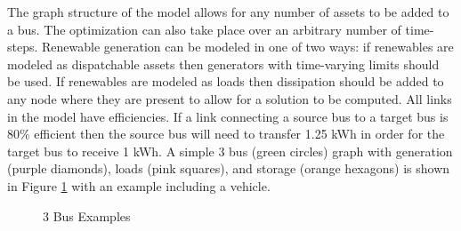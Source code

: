 \documentclass[12pt]{article}
\begin{document}
The graph structure of the model allows for any number of assets to be added to a bus. The optimization can also take place over an arbitrary number of time-steps. Renewable generation can be modeled in one of two ways: if renewables are modeled as dispatchable assets then generators with time-varying limits should be used. If renewables are modeled as loads then dissipation should be added to any node where they are present to allow for a solution to be computed. All links in the model have efficiencies. If a link connecting a source bus to a target bus is 80\% efficient then the source bus will need to transfer 1.25 kWh in order for the target bus to receive 1 kWh. A simple 3 bus (green circles) graph with generation (purple diamonds), loads (pink squares), and storage (orange hexagons) is shown in Figure \ref{fig:3_bus} with an example including a vehicle.

\begin{figure}[H]
	\centering
	\caption{3 Bus Examples}\label{fig:3_bus}
\end{figure}
\end{document}
